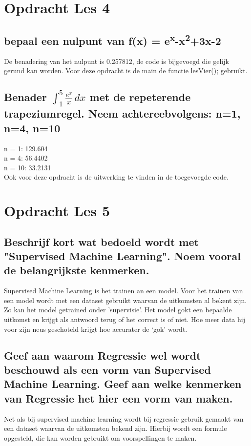 \documentclass{article}%
\begin{document}
\section{Opdracht Les 4}
\subsection{\normalsize{bepaal een nulpunt van f(x) = e\textsuperscript{x}-x\textsuperscript{2}+3x-2}}
De benadering van het nulpunt is 0.257812, de code is bijgevoegd die gelijk gerund kan worden. Voor deze opdracht is de main de functie lesVier(); gebruikt.

\subsection{\normalsize{Benader $\int_{1}^{5} \frac{e^x}{x} \,dx$ met de repeterende trapeziumregel. Neem achtereebvolgens: n=1, n=4, n=10}} 
n = 1: 129.604\\
n = 4: 56.4402\\
n = 10: 33.2131\\
Ook voor deze opdracht is de uitwerking te vinden in de toegevoegde code. 


\section{Opdracht Les 5}
\subsection{\normalsize{Beschrijf kort wat bedoeld wordt met "Supervised Machine Learning". Noem vooral de belangrijkste kenmerken.}}

Supervised Machine Learning is het trainen an een model. Voor het trainen van een model wordt met een dataset gebruikt waarvan de uitkomsten al bekent zijn. 
Zo kan het model getrained onder 'supervisie'. Het model gokt een bepaalde uitkomst en krijgt als antwoord terug of het correct is of niet. Hoe meer data hij voor zijn neus geschoteld krijgt hoe accurater de ‘gok’ wordt.

\subsection{\normalsize{Geef aan waarom Regressie wel wordt beschouwd als een vorm van Supervised Machine Learning. Geef aan welke kenmerken van Regressie het hier een vorm van maken.}}
Net als bij supervised machine learning wordt bij regressie gebruik gemaakt van een dataset waarvan de uitkomsten bekend zijn. Hierbij wordt een formule opgesteld, die kan worden gebruikt om voorspellingen te maken.
\end{document}
